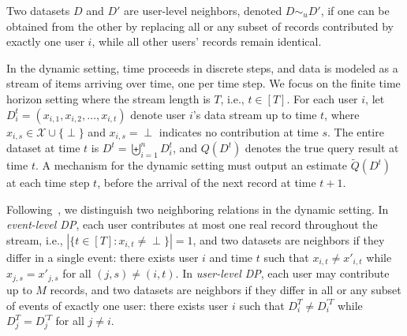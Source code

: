 \begin{definition}
Two datasets $D$ and $D'$ are user-level neighbors, denoted $D \sim_u D'$, if one can be obtained from the other by replacing all or any subset of records contributed by exactly one user $i$, while all other users' records remain identical.
\end{definition}



In the dynamic setting, time proceeds in discrete steps, and data is modeled as a stream of items arriving over time, one per time step. We focus on the finite time horizon setting where the stream length is $T$, i.e., $t \in [T]$.
For each user $i$, let $D_i^t = (x_{i,1}, x_{i,2}, \ldots, x_{i,t})$ denote user $i$'s data stream up to time $t$, where $x_{i,s} \in \mathcal{X} \cup \{\perp\}$ and $x_{i,s} = \perp$ indicates no contribution at time $s$. 
The entire dataset at time $t$ is $D^t = \biguplus_{i=1}^n D_i^t$, and $Q(D^t)$ denotes the true query result at time $t$. 
A mechanism for the dynamic setting must output an estimate $\tilde{Q}(D^t)$ at each time step $t$, before the arrival of the next record at time $t+1$.





Following~\cite{dwork2010differential}, we distinguish two neighboring relations in the dynamic setting. 
In \textit{event-level DP}, each user contributes at most one real record throughout the stream, i.e., $|\{t \in [T] : x_{i,t} \neq \perp\}| = 1$, and two datasets are neighbors if they differ in a single event: there exists user $i$ and time $t$ such that $x_{i,t} \neq x'_{i,t}$ while $x_{j,s} = x'_{j,s}$ for all $(j,s) \neq (i,t)$. 
In \textit{user-level DP}, each user may contribute up to $M$ records, and two datasets are neighbors if they differ in all or any subset of events of exactly one user: there exists user $i$ such that $D_i^T \neq D_i^{\prime T}$ while $D_j^T = D_j^{\prime T}$ for all $j \neq i$.




